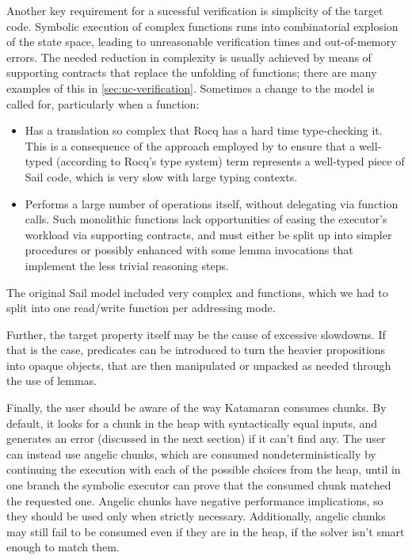 Another key requirement for a sucessful verification is simplicity of the target code. Symbolic execution of complex functions runs into combinatorial explosion of the state space, leading to unreasonable verification times and out-of-memory errors. The needed reduction in complexity is usually achieved by means of supporting contracts that replace the unfolding of functions; there are many examples of this in \cref{sec:uc-verification}. Sometimes a change to the model is called for, particularly when a function:
\begin{itemize}
\item Has a \usail translation so complex that Rocq has a hard time type-checking it. This is a consequence of the approach employed by \usail to ensure that a well-typed (according to Rocq's type system) \usail term represents a well-typed piece of Sail code, which is very slow with large typing contexts.
\item Performs a large number of operations itself, without delegating via function calls. Such monolithic functions lack opportunities of easing the executor's workload via supporting contracts, and must either be split up into simpler procedures or possibly enhanced with some lemma invocations that implement the less trivial reasoning steps.
\end{itemize}
The original Sail model included very complex  and  functions, which we had to split into one read/write function per addressing mode.

Further, the target property itself may be the cause of excessive slowdowns. If that is the case, predicates can be introduced to turn the heavier propositions into opaque objects, that are then manipulated or unpacked as needed through the use of lemmas.

Finally, the user should be aware of the way Katamaran consumes chunks. By default, it looks for a chunk in the heap with syntactically equal inputs, and generates an error (discussed in the next section) if it can't find any. The user can instead use angelic chunks, which are consumed nondeterministically by continuing the execution with each of the possible choices from the heap, until in one branch the symbolic executor can prove that the consumed chunk matched the requested one. Angelic chunks have negative performance implications, so they should be used only when strictly necessary. Additionally, angelic chunks may still fail to be consumed even if they are in the heap, if the solver isn't smart enough to match them.

